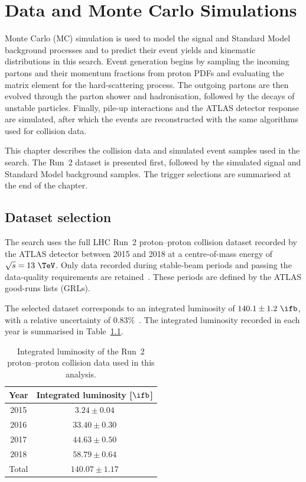 \chapter{Data and Monte Carlo Simulations}
\label{chapter:MC_simulation}

Monte Carlo (MC) simulation is used to model the signal and Standard Model background processes and to predict their event yields and kinematic distributions in this search.
Event generation begins by sampling the incoming partons and their momentum fractions from proton PDFs and evaluating the matrix element for the hard-scattering process.
The outgoing partons are then evolved through the parton shower and hadronisation, followed by the decays of unstable particles.
Finally, pile-up interactions and the ATLAS detector response are simulated, after which the events are reconstructed with the same algorithms used for collision data.

This chapter describes the collision data and simulated event samples used in the search.
The Run~2 dataset is presented first, followed by the simulated signal and Standard Model background samples.
The trigger selections are summarised at the end of the chapter.


\section{Dataset selection}
\label{sec:dataset_selection}

The search uses the full LHC Run~2 proton--proton collision dataset recorded by the ATLAS detector between 2015 and 2018 at a centre-of-mass energy of $\sqrt{s}=13~\TeV$.
Only data recorded during stable-beam periods and passing the data-quality requirements are retained~\cite{ATLASDataQualityRun2}.
These periods are defined by the ATLAS good-runs lists (GRLs).

The selected dataset corresponds to an integrated luminosity of $140.1\pm1.2~\ifb$, with a relative uncertainty of $0.83\%$~\cite{ATLASLumiRun2}.
The integrated luminosity recorded in each year is summarised in Table~\ref{tab:run2_luminosity}.

\begin{table}[htbp]
    \centering
    \caption{Integrated luminosity of the Run~2 proton--proton collision data used in this analysis.}
    \label{tab:run2_luminosity}
    \begin{tabular}{cc}
        \hline
        Year & Integrated luminosity [$\ifb$] \\
        \hline
        2015 & $3.24\pm0.04$ \\
        2016 & $33.40\pm0.30$ \\
        2017 & $44.63\pm0.50$ \\
        2018 & $58.79\pm0.64$ \\
        \hline
        Total & $140.07\pm1.17$ \\
        \hline
    \end{tabular}
\end{table}

